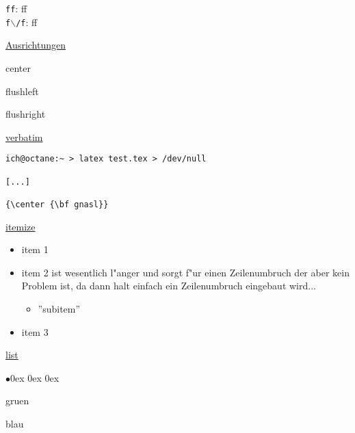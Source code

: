 \documentclass[11pt,twocolumn,vertical]{book}
\begin{document}
{\tt ff}: ff\\
{\tt f$\backslash$/f}: f\/f


\hrulefill

\underline{Ausrichtungen}

\begin{center}
  center
\end{center}

\begin{flushleft}
  flushleft
\end{flushleft}

\begin{flushright}
  flushright
\end{flushright}


\hrulefill

\underline{verbatim}

\begin{verbatim}
ich@octane:~ > latex test.tex > /dev/null

[...]

{\center {\bf gnasl}}
\end{verbatim}


\hrulefill

\underline{itemize}

\begin{itemize}
  \item item 1
  \item item 2 ist wesentlich l"anger und sorgt f"ur einen Zeilenumbruch der 
        aber kein Problem ist, da dann halt einfach ein Zeilenumbruch 
        eingebaut wird...
  \begin{itemize}
    \item ''subitem''
  \end{itemize}
  \item item 3
\end{itemize}


\hrulefill

\underline{list}

\begin{list}{$\bullet$}{\topsep 0ex \partopsep 0ex \itemsep 0ex}
  \item gruen
  \item blau
\end{list}
\end{document}
